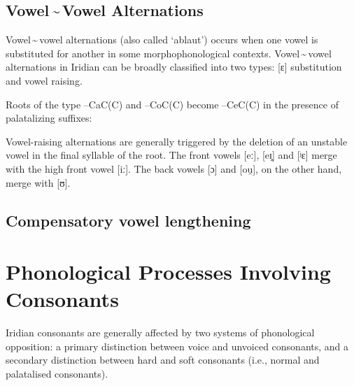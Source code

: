 \subsection{Vowel\,\sim\,Vowel Alternations}
Vowel\,\sim\,vowel alternations (also called `ablaut') occurs when one vowel is substituted for another in some morphophonological contexts. Vowel\,\sim\,vowel alternations in Iridian can be broadly classified into two types: [ɛ] substitution and vowel raising.

Roots of the type --CaC(C) and --CoC(C) become --CeC(C) in the presence of palatalizing suffixes:

\ex
{}
\xe

Vowel-raising alternations are generally triggered by the deletion of an unstable vowel in the final syllable of the root. The front vowels [eː], [eɪ̯] and [ʲɛ] merge with the high front vowel [iː]. The back vowels [ɔ] and [ou̯], on the other hand, merge with [ʊ].

\ex
{}
\xe


\subsection{Compensatory vowel lengthening}



\section{Phonological Processes Involving Consonants}


Iridian consonants are generally affected by two systems of phonological opposition: a primary distinction between voice and unvoiced consonants, and a secondary distinction between hard and soft consonants (i.e., normal and palatalised consonants).


